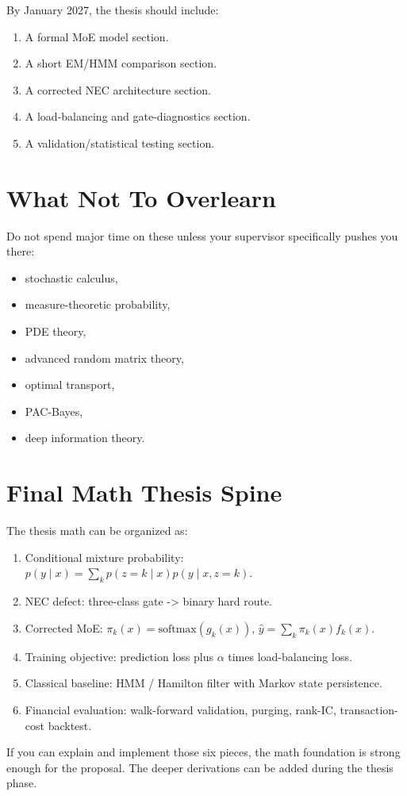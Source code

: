 \documentclass[11pt]{article}
\begin{document}
By January 2027, the thesis should include:

\begin{enumerate}
  \item A formal MoE model section.
  \item A short EM/HMM comparison section.
  \item A corrected NEC architecture section.
  \item A load-balancing and gate-diagnostics section.
  \item A validation/statistical testing section.
\end{enumerate}

\section{What Not To Overlearn}

Do not spend major time on these unless your supervisor specifically pushes you there:

\begin{itemize}
  \item stochastic calculus,
  \item measure-theoretic probability,
  \item PDE theory,
  \item advanced random matrix theory,
  \item optimal transport,
  \item PAC-Bayes,
  \item deep information theory.
\end{itemize}

\section{Final Math Thesis Spine}

The thesis math can be organized as:

\begin{enumerate}
  \item Conditional mixture probability: \(p(y \mid x)=\sum_k p(z=k \mid x)p(y \mid x,z=k)\).
  \item NEC defect: three-class gate -> binary hard route.
  \item Corrected MoE: \(\pi_k(x)=\mathrm{softmax}(g_k(x))\), \(\hat{y}=\sum_k \pi_k(x)f_k(x)\).
  \item Training objective: prediction loss plus \(\alpha\) times load-balancing loss.
  \item Classical baseline: HMM / Hamilton filter with Markov state persistence.
  \item Financial evaluation: walk-forward validation, purging, rank-IC, transaction-cost backtest.
\end{enumerate}

If you can explain and implement those six pieces, the math foundation is strong enough for the proposal. The deeper derivations can be added during the thesis phase.
\end{document}
